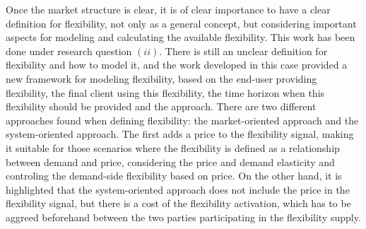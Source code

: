 Once the market structure is clear, it is of clear importance to have a clear definition for flexibility, not only as a general concept, but considering important aspects for modeling and calculating the available flexibility. This work has been done under research question $(ii)$. There is still an unclear definition for flexibility and how to model it, and the work developed in this case provided a new framework for modeling flexibility, based on the end-user providing flexibility, the final client using this flexibility, the time horizon when this flexibility should be provided and the approach. There are two different approaches found when defining flexibility: the market-oriented approach and the system-oriented approach. The first adds a price to the flexibility signal, making it suitable for those scenarios where the flexibility is defined as a relationship between demand and price, considering the price and demand elasticity and controling the demand-side flexibility based on price. On the other hand, it is highlighted that the system-oriented approach does not include the price in the flexibility signal, but there is a cost of the flexibility activation, which has to be aggreed beforehand between the two parties participating in the flexibility supply. 

